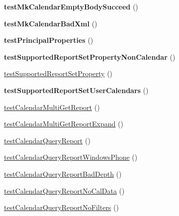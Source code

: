 \begin{DoxyCompactItemize}
{\bfseries test\+Mk\+Calendar\+Empty\+Body\+Succeed} ()
\item 
\mbox{\label{class_sabre_1_1_cal_d_a_v_1_1_plugin_test_ab82da2778b7e995033c44e37bb76ea58}} 
{\bfseries test\+Mk\+Calendar\+Bad\+Xml} ()
\item 
\mbox{\label{class_sabre_1_1_cal_d_a_v_1_1_plugin_test_a3de77b598f20659b2ba31f6c1aa0a589}} 
{\bfseries test\+Principal\+Properties} ()
\item 
\mbox{\label{class_sabre_1_1_cal_d_a_v_1_1_plugin_test_a5434a90496ce6d473645d40952b98704}} 
{\bfseries test\+Supported\+Report\+Set\+Property\+Non\+Calendar} ()
\item 
\mbox{\hyperlink{class_sabre_1_1_cal_d_a_v_1_1_plugin_test_a1a52123867107a9932e33fdb8ddb495d}{test\+Supported\+Report\+Set\+Property}} ()
\item 
\mbox{\label{class_sabre_1_1_cal_d_a_v_1_1_plugin_test_a56996ba5e8a27b2f49cbdf4939fe1ada}} 
{\bfseries test\+Supported\+Report\+Set\+User\+Calendars} ()
\item 
\mbox{\hyperlink{class_sabre_1_1_cal_d_a_v_1_1_plugin_test_aa0c276cbead4b6e5f9f93bb346cddc83}{test\+Calendar\+Multi\+Get\+Report}} ()
\item 
\mbox{\hyperlink{class_sabre_1_1_cal_d_a_v_1_1_plugin_test_acb4b3a01a56bafa9ab07ae19cd7b8da2}{test\+Calendar\+Multi\+Get\+Report\+Expand}} ()
\item 
\mbox{\hyperlink{class_sabre_1_1_cal_d_a_v_1_1_plugin_test_ab5ad85fa986f23f48c05a22bf8272cb1}{test\+Calendar\+Query\+Report}} ()
\item 
\mbox{\hyperlink{class_sabre_1_1_cal_d_a_v_1_1_plugin_test_a20f07f9766b6f591278d62f1442e6492}{test\+Calendar\+Query\+Report\+Windows\+Phone}} ()
\item 
\mbox{\hyperlink{class_sabre_1_1_cal_d_a_v_1_1_plugin_test_a74a8a21b6c5b3bbda84cc5fdfd680e47}{test\+Calendar\+Query\+Report\+Bad\+Depth}} ()
\item 
\mbox{\hyperlink{class_sabre_1_1_cal_d_a_v_1_1_plugin_test_a4f98fd6a364f3982549d04320e902e29}{test\+Calendar\+Query\+Report\+No\+Cal\+Data}} ()
\item 
\mbox{\hyperlink{class_sabre_1_1_cal_d_a_v_1_1_plugin_test_a1312e49fb739243fdd406dd9a0aaa246}{test\+Calendar\+Query\+Report\+No\+Filters}} ()

\end{DoxyCompactItemize}
